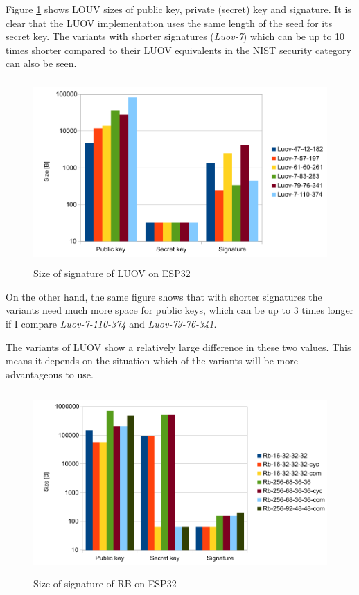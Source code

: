 \documentclass[thesis=M,english]{FITthesis}[2019/12/23]
\begin{document}
\bigskip
\noindent
Figure \ref{sign-luov} shows LOUV sizes of public key, private (secret) key and signature. It is clear that the LUOV implementation uses the same length of the seed for its secret key.  The variants with shorter signatures (\textit{Luov-7}) which can be up to 10 times shorter compared to their LUOV equivalents in the NIST security category can also be seen. 

\begin{figure}[H]
\centering
\includegraphics[width=13cm,height=7cm]{images/sign-luov.pdf}
\caption{Size of signature of LUOV on ESP32}
\label{sign-luov}
\end{figure}

\bigskip
\noindent
On the other hand, the same figure shows that with shorter signatures the variants need much more space for public keys, which can be up to 3 times longer if I compare \textit{Luov-7-110-374} and \textit{Luov-79-76-341}.

\bigskip
\noindent
The variants of LUOV show a relatively large difference in these two values. This means it depends on the situation which of the variants will be more advantageous to use.

\begin{figure}[H]
\centering
\includegraphics[width=13cm,height=7cm]{images/sign-rb.pdf}
\caption{Size of signature of RB on ESP32}
\label{sign-rb}
\end{figure}
\end{document}
